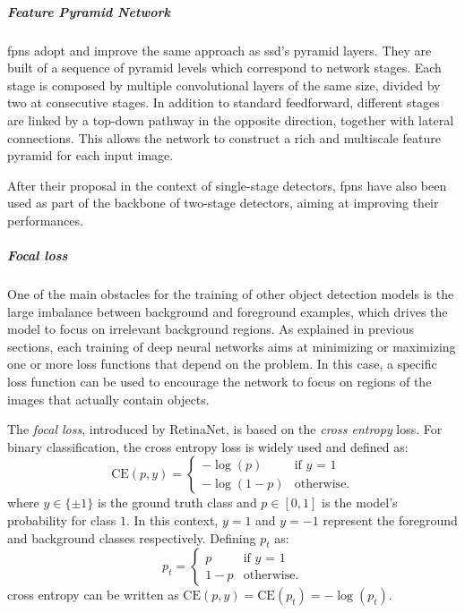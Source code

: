 \documentclass[%
    corpo=12pt,
    twoside,
    stile=classica,   
    tipotesi=magistrale,
    evenboxes,
    english,
	numerazioneromana,
]{toptesi}
\begin{document}
\subparagraph{Feature Pyramid Network}
\glspl{fpn}\cite{lin2017feature} adopt and improve the same approach as \acrshort{ssd}'s pyramid layers. They are built of a sequence of pyramid levels which correspond to network stages. Each stage is composed by multiple convolutional layers of the same size, divided by two at consecutive stages. In addition to standard feedforward, different stages are linked by a top-down pathway in the opposite direction, together with lateral connections. This allows the network to construct a rich and multiscale feature pyramid for each input image.

After their proposal in the context of single-stage detectors, \glspl{fpn} have also been used as part of the backbone of two-stage detectors, aiming at improving their performances.

\subparagraph{Focal loss}
One of the main obstacles for the training of other object detection models is the large imbalance between background and foreground examples, which drives the model to focus on irrelevant background regions.
As explained in previous sections, each training of deep neural networks aims at minimizing or maximizing one or more loss functions that depend on the problem.
In this case, a specific loss function can be used to encourage the network to focus on regions of the images that actually contain objects.

\bigskip
The \textit{focal loss}, introduced by RetinaNet, is based on the \textit{cross entropy} loss. For binary classification, the cross entropy loss is widely used and defined as:
\begin{equation}
	\text{CE}(p,y) = \begin{cases}
		-\log(p) & \text{if $y$ = 1}\\
		-\log(1-p) & \text{otherwise.}
	\end{cases}
\end{equation}
where $y\in \{\pm 1\}$ is the ground truth class and $p\in\left[0,1\right]$ is the model's probability for class $1$. In this context, $y=1$ and $y=-1$ represent the foreground and background classes respectively. Defining $p_t$ as:
\begin{equation}
	p_t = \begin{cases}
		p & \text{if $y$ = 1}\\
		1-p & \text{otherwise.}
	\end{cases}
\end{equation}
cross entropy can be written as $\text{CE}(p,y) = \text{CE}(p_t) = -\log(p_t)$.
\end{document}
